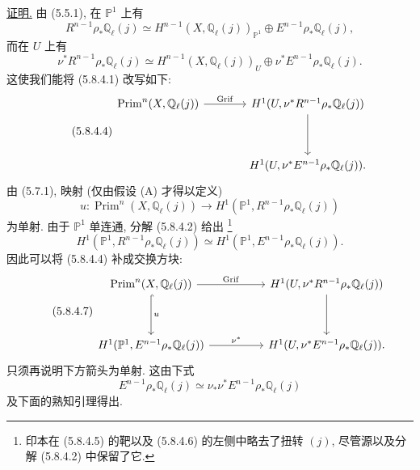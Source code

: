\underline{证明.}
由 (5.5.1), 在 $\mathbb P^1$ 上有
\begin{equation}\tag{5.8.4.2}
R^{n-1}\rho_*\mathbb Q_\ell(j)
\simeq
H^{n-1}(X,\mathbb Q_\ell(j))_{\mathbb P^1}
\oplus E^{n-1}\rho_*\mathbb Q_\ell(j),
\end{equation}
而在 $U$ 上有
\begin{equation}\tag{5.8.4.3}
\nu^*R^{n-1}\rho_*\mathbb Q_\ell(j)
\simeq
H^{n-1}(X,\mathbb Q_\ell(j))_U
\oplus \nu^*E^{n-1}\rho_*\mathbb Q_\ell(j).
\end{equation}
这使我们能将 (5.8.4.1) 改写如下:
\begin{equation}\tag{5.8.4.4}
\begin{tikzcd}[row sep=huge,column sep=large]
\operatorname{Prim}^n(X,\mathbb Q_\ell(j))
  \arrow[r,"\operatorname{Grif}"]
&
H^1(U,\nu^*R^{n-1}\rho_*\mathbb Q_\ell(j))
  \arrow[d]
\\
{}
&
H^1(U,\nu^*E^{n-1}\rho_*\mathbb Q_\ell(j)).
\end{tikzcd}
\end{equation}
由 (5.7.1), 映射 (仅由假设 (A) 才得以定义)
\begin{equation}\tag{5.8.4.5}
u:\operatorname{Prim}^n(X,\mathbb Q_\ell(j))
\longrightarrow
H^1(\mathbb P^1,R^{n-1}\rho_*\mathbb Q_\ell(j))
\end{equation}
为单射. 由于 $\mathbb P^1$ 单连通, 分解 (5.8.4.2) 给出
\footnote{印本在 (5.8.4.5) 的靶以及 (5.8.4.6) 的左侧中略去了扭转 $(j)$, 尽管源以及分解 (5.8.4.2) 中保留了它.}
\begin{equation}\tag{5.8.4.6}
H^1(\mathbb P^1,R^{n-1}\rho_*\mathbb Q_\ell(j))
\simeq
H^1(\mathbb P^1,E^{n-1}\rho_*\mathbb Q_\ell(j)).
\end{equation}
因此可以将 (5.8.4.4) 补成交换方块:
\begin{equation}\tag{5.8.4.7}
\begin{tikzcd}[column sep=huge,row sep=huge]
\operatorname{Prim}^n(X,\mathbb Q_\ell(j))
  \arrow[r,"\operatorname{Grif}"]
  \arrow[d,hook,"u"]
&
H^1(U,\nu^*R^{n-1}\rho_*\mathbb Q_\ell(j))
  \arrow[d]
\\
H^1(\mathbb P^1,E^{n-1}\rho_*\mathbb Q_\ell(j))
  \arrow[r,"\nu^*"]
&
H^1(U,\nu^*E^{n-1}\rho_*\mathbb Q_\ell(j)).
\end{tikzcd}
\end{equation}
只须再说明下方箭头为单射. 这由下式
\begin{equation}\tag{5.8.4.8}
E^{n-1}\rho_*\mathbb Q_\ell(j)
\simeq
\nu_*\nu^*E^{n-1}\rho_*\mathbb Q_\ell(j)
\end{equation}
及下面的熟知引理得出.

